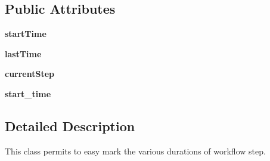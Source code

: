 \subsection*{Public Attributes}
\begin{DoxyCompactItemize}
\item 
\hypertarget{classsrc_1_1fr_1_1tagc_1_1rainet_1_1core_1_1util_1_1time_1_1Timer_1_1Timer_ac57098235f5dc49279099693e9dd1ac6}{{\bfseries start\-Time}}\label{classsrc_1_1fr_1_1tagc_1_1rainet_1_1core_1_1util_1_1time_1_1Timer_1_1Timer_ac57098235f5dc49279099693e9dd1ac6}

\item 
\hypertarget{classsrc_1_1fr_1_1tagc_1_1rainet_1_1core_1_1util_1_1time_1_1Timer_1_1Timer_a99584942b75dc20471519c486a26a0d1}{{\bfseries last\-Time}}\label{classsrc_1_1fr_1_1tagc_1_1rainet_1_1core_1_1util_1_1time_1_1Timer_1_1Timer_a99584942b75dc20471519c486a26a0d1}

\item 
\hypertarget{classsrc_1_1fr_1_1tagc_1_1rainet_1_1core_1_1util_1_1time_1_1Timer_1_1Timer_a97692d980b76dcbdf835e879d7ae3a40}{{\bfseries current\-Step}}\label{classsrc_1_1fr_1_1tagc_1_1rainet_1_1core_1_1util_1_1time_1_1Timer_1_1Timer_a97692d980b76dcbdf835e879d7ae3a40}

\item 
\hypertarget{classsrc_1_1fr_1_1tagc_1_1rainet_1_1core_1_1util_1_1time_1_1Timer_1_1Timer_af1edacee7ba7ecc12d45a60f64eca7fc}{{\bfseries start\-\_\-time}}\label{classsrc_1_1fr_1_1tagc_1_1rainet_1_1core_1_1util_1_1time_1_1Timer_1_1Timer_af1edacee7ba7ecc12d45a60f64eca7fc}

\end{DoxyCompactItemize}


\subsection{Detailed Description}
This class permits to easy mark the various durations of workflow step. 

